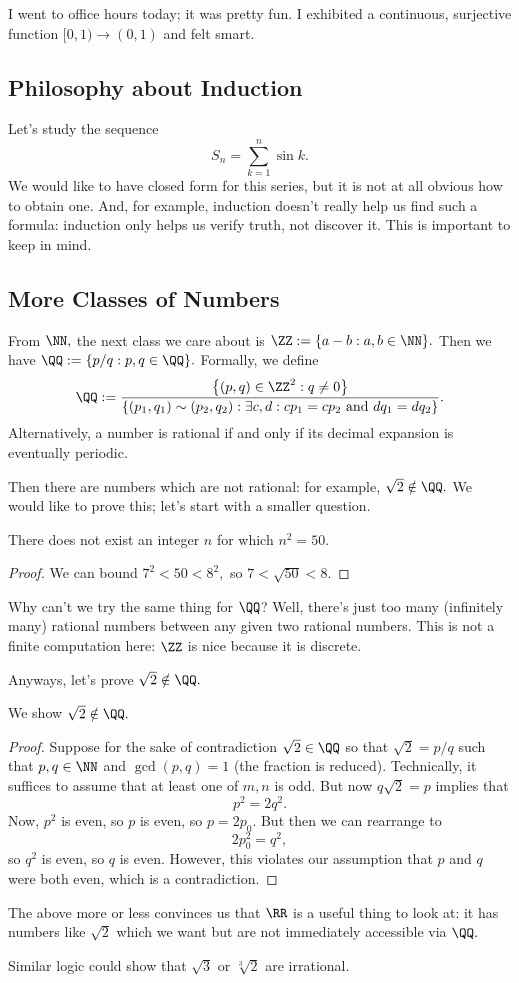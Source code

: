 








I went to office hours today; it was pretty fun. I exhibited a continuous, surjective function $[0,1)\to(0,1)$ and felt smart.

\subsection{Philosophy about Induction}
Let's study the sequence
\[S_n=\sum_{k=1}^n\sin k.\]
We would like to have closed form for this series, but it is not at all obvious how to obtain one. And, for example, induction doesn't really help us find such a formula: induction only helps us verify truth, not discover it. This is important to keep in mind.

\subsection{More Classes of Numbers}
From $\NN,$ the next class we care about is $\ZZ:=\{a-b:a,b\in\NN\}.$ Then we have $\QQ:=\{p/q:p,q\in\QQ\}.$ Formally, we define
\[\QQ:=\frac{\left\{(p,q)\in\ZZ^2:q\ne0\right\}}{\{(p_1,q_1)\sim(p_2,q_2):\exists c,d:cp_1=cp_2\text{ and }dq_1=dq_2\}}.\]
Alternatively, a number is rational if and only if its decimal expansion is eventually periodic.

Then there are numbers which are not rational: for example, $\sqrt2\notin\QQ.$ We would like to prove this; let's start with a smaller question.
\begin{prop}
	There does not exist an integer $n$ for which $n^2=50.$
\end{prop}
\begin{proof}
	We can bound $7^2<50<8^2,$ so $7<\sqrt{50}<8.$
\end{proof}
Why can't we try the same thing for $\QQ$? Well, there's just too many (infinitely many) rational numbers between any given two rational numbers. This is not a finite computation here: $\ZZ$ is nice because it is discrete.

Anyways, let's prove $\sqrt2\notin\QQ.$
\begin{prop} \label{prop:sqrt2}
	We show $\sqrt2\notin\QQ.$
\end{prop}
\begin{proof}
	Suppose for the sake of contradiction $\sqrt2\in\QQ$ so that $\sqrt2=p/q$ such that $p,q\in\NN$ and $\gcd(p,q)=1$ (the fraction is reduced). Technically, it suffices to assume that at least one of $m,n$ is odd. But now $q\sqrt2=p$ implies that
	\[p^2=2q^2.\]
	Now, $p^2$ is even, so $p$ is even, so $p=2p_0.$ But then we can rearrange to
	\[2p_0^2=q^2,\]
	so $q^2$ is even, so $q$ is even. However, this violates our assumption that $p$ and $q$ were both even, which is a contradiction.
\end{proof}
\begin{remark}
	The above more or less convinces us that $\RR$ is a useful thing to look at: it has numbers like $\sqrt2$ which we want but are not immediately accessible via $\QQ.$
\end{remark}
Similar logic could show that $\sqrt3$ or $\sqrt[3]2$ are irrational.

